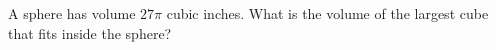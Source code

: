 A sphere has volume $27\pi$ cubic inches. What is the volume of the largest cube that fits inside the sphere?
